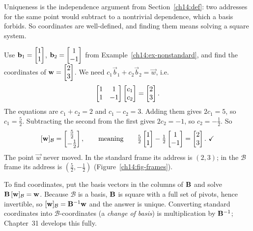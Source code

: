 Uniqueness is the independence argument from Section~\ref{ch14:def}: two
addresses for the same point would subtract to a nontrivial dependence, which a
basis forbids. So coordinates are well-defined, and finding them means solving a
square system.

\begin{example}
\label{ch14:ex-coords}
Use $\mathbf{b}_1 = \begin{bmatrix}1\\1\end{bmatrix}$, $\mathbf{b}_2 = \begin{bmatrix}1\\-1\end{bmatrix}$ from
Example~\ref{ch14:ex-nonstandard}, and find the coordinates of $\mathbf{w} =
\begin{bmatrix}2\\3\end{bmatrix}$. We need $c_1\vec{b}_1 + c_2\vec{b}_2 = \vec{w}$, i.e.
\[
  \begin{bmatrix} 1 & 1\\ 1 & -1\end{bmatrix}\begin{bmatrix}c_1\\c_2\end{bmatrix} = \begin{bmatrix}2\\3\end{bmatrix}.
\]
The equations are $c_1 + c_2 = 2$ and $c_1 - c_2 = 3$.
Adding them gives $2c_1 = 5$, so $c_1 = \tfrac52$. Subtracting the second from the first gives
$2c_2 = -1$, so $c_2 = -\tfrac12$. So
\[
  [\vec{w}]_{\mathcal B} = \colvec{\tfrac52\\[2pt]-\tfrac12},
  \qquad\text{meaning}\qquad
  \tfrac52\colvec{1\\1} - \tfrac12\colvec{1\\-1} = \colvec{2\\3}.\ \checkmark
\]
The point $\vec{w}$ never moved. In the standard frame its address is $(2,3)$; in
the $\mathcal B$ frame its address is $(\tfrac52,-\tfrac12)$
(Figure~\ref{ch14:fig-frames}).
\end{example}

\begin{focusbox}
To find coordinates, put the basis vectors in the columns of $\mathbf{B}$ and solve
$\mathbf{B}\,[\mathbf{w}]_{\mathcal B} = \mathbf{w}$. Because $\mathcal B$ is a basis,
$\mathbf{B}$ is square with a full set of pivots, hence invertible, so $[\mathbf{w}]_{\mathcal B} = \mathbf{B}^{-1}\mathbf{w}$ and the
answer is unique. Converting standard coordinates into $\mathcal B$-coordinates (a
\emph{change of basis}) is multiplication by $\mathbf{B}^{-1}$; Chapter~31 develops this fully.
\end{focusbox}

